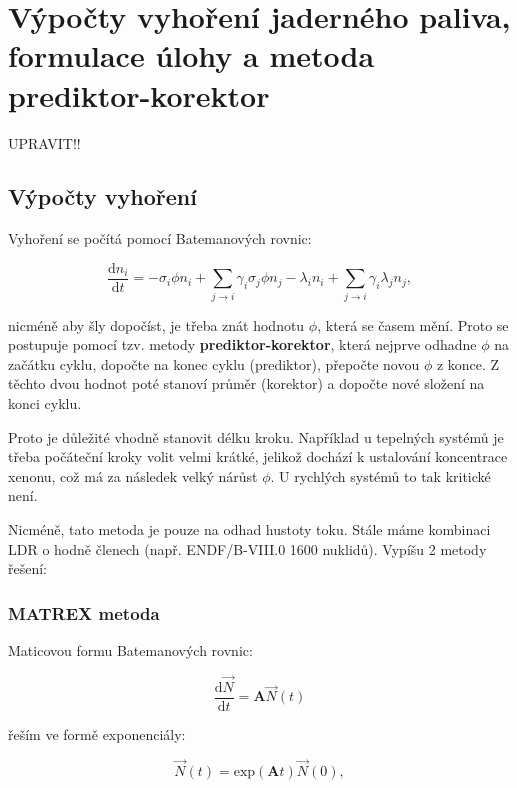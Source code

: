 \section[Vyhořívání]{Výpočty vyhoření jaderného paliva, formulace úlohy a metoda prediktor-korektor}

UPRAVIT!!

\subsection{Výpočty vyhoření}

Vyhoření se počítá pomocí Batemanových rovnic:

\begin{equation}
  \dfrac{\text{d}n_i}{\text{d}t} = -\sigma_i \phi n_i + \sum_{j \to i} \gamma_i \sigma_j \phi n_j - \lambda_i n_i + \sum_{j \to i} \gamma_i \lambda_j n_j,
\end{equation}

nicméně aby šly dopočíst, je třeba znát hodnotu $\phi$, která se časem mění. Proto se postupuje pomocí tzv. metody \textbf{prediktor-korektor}, která nejprve odhadne $\phi$ na začátku cyklu, dopočte na konec cyklu (prediktor), přepočte novou $\phi$ z konce. Z těchto dvou hodnot poté stanoví průměr (korektor) a dopočte nové složení na konci cyklu.

Proto je důležité vhodně stanovit délku kroku. Například u tepelných systémů je třeba počáteční kroky volit velmi krátké, jelikož dochází k ustalování koncentrace xenonu, což má za následek velký nárůst $\phi$. U rychlých systémů to tak kritické není.

Nicméně, tato metoda je pouze na odhad hustoty toku. Stále máme kombinaci LDR o hodně členech (např. ENDF/B-VIII.0 1600 nuklidů). Vypíšu 2 metody řešení:

\subsubsection{MATREX metoda}

Maticovou formu Batemanových rovnic:

\begin{equation}
  \dfrac{\text{d}\vec{N}}{\text{d}t} = \textbf{A} \vec{N}(t)
\end{equation}

řeším ve formě exponenciály:

\begin{equation}
  \vec{N}(t) = \text{exp} (\textbf{A}t) \vec{N}(0),
\end{equation}

